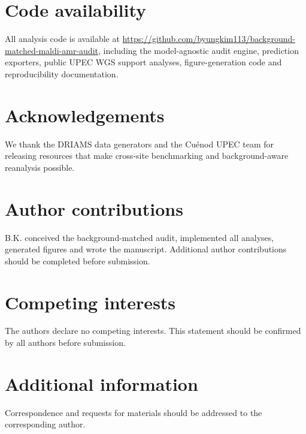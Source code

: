 \documentclass[11pt]{article}
\begin{document}
\section*{Code availability}

All analysis code is available at \url{https://github.com/byungkim113/background-matched-maldi-amr-audit}, including the model-agnostic audit engine, prediction exporters, public UPEC WGS support analyses, figure-generation code and reproducibility documentation.

\section*{Acknowledgements}

We thank the DRIAMS data generators and the Cu\'{e}nod UPEC team for releasing resources that make cross-site benchmarking and background-aware reanalysis possible.

\section*{Author contributions}

B.K. conceived the background-matched audit, implemented all analyses, generated figures and wrote the manuscript. Additional author contributions should be completed before submission.

\section*{Competing interests}

The authors declare no competing interests. This statement should be confirmed by all authors before submission.

\section*{Additional information}

Correspondence and requests for materials should be addressed to the corresponding author.
\end{document}
